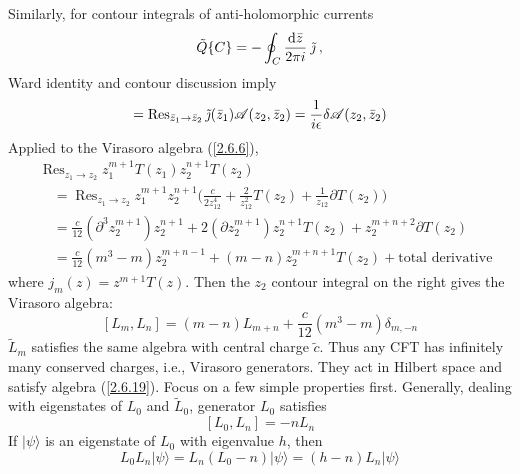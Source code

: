 Similarly, for contour integrals of anti-holomorphic currents    
\begin{equation}
	\tilde{Q}\{C\}=-\oint_{C} \frac{\mathrm{d} \bar{z}}{2 \pi i} \: \tilde{\jmath} \:, \label{2.6.16}
\end{equation}
Ward identity and contour discussion imply    
\begin{equation}
	[\tilde{Q}, \mathscr{A}(z_{2}, \bar{z}_{2})]=\operatorname{Res}_{\bar{z}_{1} \to \bar{z}_{2}} \tilde{\jmath}(\bar{z}_{1}) 
	\mathscr{A}(z_{2}, \bar{z}_{2})=\frac{1}{\mi \epsilon} \delta \mathscr{A}(z_{2}, \bar{z}_{2}) \label{2.6.17}
\end{equation}
Applied to the Virasoro algebra (\ref{2.6.6}),    
\begin{align}
	&\operatorname{Res}_{z_{1} \to z_{2}} z_{1}^{m+1} T(z_{1}) z_{2}^{n+1} T(z_{2})  \nonumber \\
	&\quad =\operatorname{Res}_{z_{1} \rightarrow z_{2}} z_{1}^{m+1} z_{2}^{n+1}\Biggl(\frac{c}{2 z_{12}^{4}}+\frac{2}{z_{12}^{2}} T(z_{2})
	+\frac{1}{z_{12}} \partial T(z_{2})\Biggr) \nonumber \\
	&\quad =\frac{c}{12}(\partial^{3} z_{2}^{m+1}) z_{2}^{n+1}+2(\partial z_{2}^{m+1}) z_{2}^{n+1} T(z_{2})
	+z_{2}^{m+n+2} \partial T(z_{2}) \nonumber \\
	&\quad =\frac{c}{12}(m^{3}-m) z_{2}^{m+n-1}+(m-n) z_{2}^{m+n+1} T(z_{2})+\text {total derivative}  \label{2.6.18}
\end{align}
where $j_{m}(z)=z^{m+1} T(z)$.    
Then the $z_2$ contour integral on the right gives the Virasoro algebra:    
\begin{equation}\label{2.6.19}
	\left[L_{m}, L_{n}\right]=(m-n) L_{m+n}+\frac{c}{12}\left(m^{3}-m\right) \delta_{m,-n}
\end{equation}
$\tilde{L}_{m}$ satisfies the same algebra with central charge $\tilde{c}$.    
Thus any CFT has infinitely many conserved charges, i.e., Virasoro generators. They act in Hilbert space and satisfy algebra (\ref{2.6.19}). Focus on a few simple properties first. Generally, dealing with eigenstates of $L_{0}$ and $\tilde{L}_{0}$, generator $L_{0}$ satisfies    
\begin{equation}
	\left[L_{0}, L_{n}\right]=-n L_{n}
\end{equation}
If $|\psi\rangle$ is an eigenstate of $L_{0}$ with eigenvalue $h$, then    
\begin{equation}
	L_{0} L_{n}|\psi\rangle=L_{n}\left(L_{0}-n\right)|\psi\rangle=(h-n) L_{n}|\psi\rangle
\end{equation}

